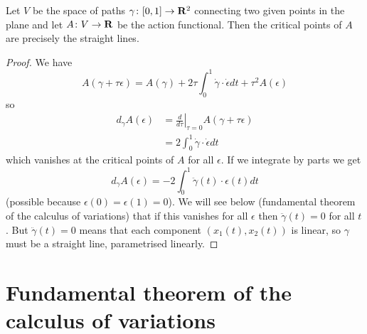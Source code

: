 \begin{prp}
Let $V$ be the space of paths $\gamma\colon[0,1]\to\mathbf{R}^2$ connecting two given points in the plane and let $A\colon V\to\mathbf{R}$ be the action functional. Then the critical points of $A$ are precisely the straight lines.
\end{prp}
\begin{proof}
We have
\[A(\gamma+\tau\epsilon)=A(\gamma)+2\tau\int_0^1\dot{\gamma}\cdot\dot{\epsilon}dt+\tau^2A(\epsilon)\]
so
\begin{align*}
d_{\gamma}A(\epsilon)&=\left.\frac{d}{d\tau}\right|_{\tau=0}A(\gamma+\tau\epsilon)\\
&=2\int_0^1\dot{\gamma}\cdot\dot{\epsilon}dt
\end{align*}
which vanishes at the critical points of $A$ for all $\epsilon$. If we integrate by parts we get
\[d_{\gamma}A(\epsilon)=-2\int_0^1\ddot{\gamma}(t)\cdot\epsilon(t)dt\]
(possible because $\epsilon(0)=\epsilon(1)=0$). We will see below (fundamental theorem of the calculus of variations) that if this vanishes for all $\epsilon$ then $\ddot{\gamma}(t)=0$ for all $t$. But $\ddot{\gamma}(t)=0$ means that each component $(x_1(t),x_2(t))$ is linear, so $\gamma$ must be a straight line, parametrised linearly.
\end{proof}

\section{Fundamental theorem of the calculus of variations}

